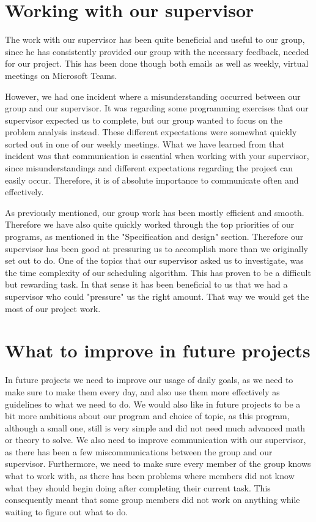 \section{Working with our supervisor}
The work with our supervisor has been quite beneficial and useful to our group, since he has consistently provided our group with the necessary feedback, needed for our project. This has been done though both emails as well as weekly, virtual meetings on Microsoft Teams.

However, we had one incident where a misunderstanding occurred between our group and our supervisor. It was regarding some programming exercises that our supervisor expected us to complete, but our group wanted to focus on the problem analysis instead. These different expectations were somewhat quickly sorted out in one of our weekly meetings.
What we have learned from that incident was that communication is essential when working with your supervisor, since misunderstandings and different expectations regarding the project can easily occur. Therefore, it is of absolute importance to communicate often and effectively.

As previously mentioned, our group work has been mostly efficient and smooth. Therefore we have also quite quickly worked through the top priorities of our programs, as mentioned in the "Specification and design" section. Therefore our supervisor has been good at pressuring us to accomplish more than we originally set out to do. One of the topics that our supervisor asked us to investigate, was the time complexity of our scheduling algorithm. 
This has proven to be a difficult but rewarding task. In that sense it has been beneficial to us that we had a supervisor who could "pressure" us the right amount. That way we would get the most of our project work.

\section{What to improve in future projects}
In future projects we need to improve our usage of daily goals, as we need to make sure to make them every day, and also use them more effectively as guidelines to what we need to do. We would also like in future projects to be a bit more ambitious about our program and choice of topic, as this program, although a small one, still is very simple and did not need much advanced math or theory to solve. We also need to improve communication with our supervisor, as there has been a few miscommunications between the group and our supervisor. Furthermore, we need to make sure every member of the group knows what to work with, as there has been problems where members did not know what they should begin doing after completing their current task. This consequently meant that some group members did not work on anything while waiting to figure out what to do.

